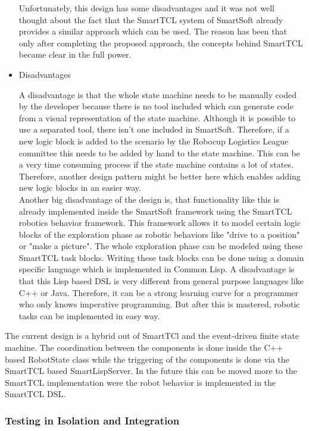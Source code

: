 \begin{itemize}
Unfortunately, this design has some disadvantages and it was not well thought about the fact that the SmartTCL system of SmartSoft already provides a similar approach which can be used. The reason has been that only after completing the proposed approach, the concepts behind SmartTCL became clear in the full power.

\item Disadvantages

A disadvantage is that the whole state machine needs to be manually coded by the developer because there is no tool included which can generate code from a visual representation 
of the state machine. Although it is possible to use a separated tool, there isn't one included in SmartSoft. Therefore, if a new logic block is added to the scenario by the Robocup Logistics League committee this needs to be added by hand to the state machine. This can be a very time consuming process if the state machine contains a lot of states. Therefore, another design pattern might be better here which enables adding new logic blocks in an easier way. \\

Another big disadvantage of the design is, that functionality like this is already implemented inside the SmartSoft framework using the SmartTCL robotics behavior framework.
This framework allows it to model certain logic blocks of the exploration phase as robotic behaviors like "drive to a position" or "make a picture". The whole exploration phase can be modeled using these SmartTCL task blocks. Writing these task blocks can be done using a domain specific language which is implemented in Common Lisp. A disadvantage is that this Lisp based DSL is very different from general purpose languages like C++ or Java. Therefore, it can be a strong learning curve for a programmer who only knows imperative programming. But after this is mastered, robotic tasks can be implemented in easy way. 


\end{itemize}


The current design is a hybrid out of SmartTCl and the event-driven finite state machine. The coordination between the components is done inside the C++ based RobotState class while the
triggering of the components is done via the SmartTCL based SmartLispServer. In the future this can be moved more to the SmartTCL implementation were the robot behavior is implemented in the SmartTCL DSL. 


\subsubsection{Testing in Isolation and Integration}

